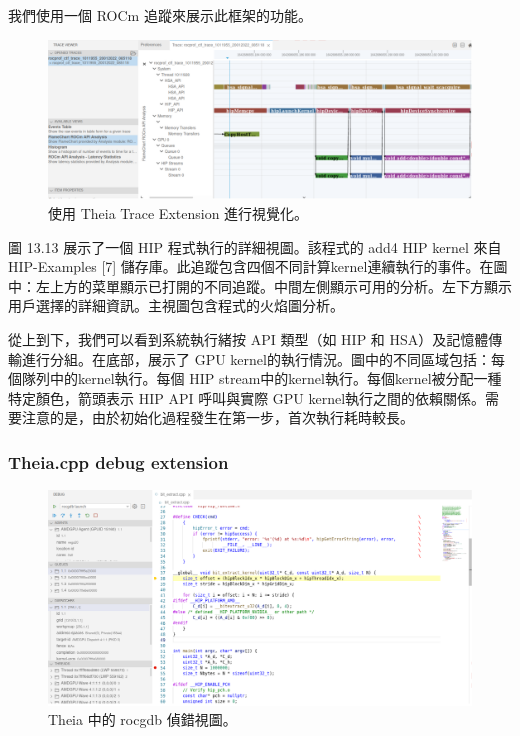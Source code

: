 我們使用一個 ROCm 追蹤來展示此框架的功能。

\begin{figure}
    \centering
    \includegraphics[width=0.9\linewidth]{FileAusiliari/Screenshots/Figure13-13.png}
    \caption{使用 Theia Trace Extension 進行視覺化。}
    \label{fig:PAPI13}
\end{figure}

圖 13.13 展示了一個 HIP 程式執行的詳細視圖。該程式的 add4 HIP kernel 來自 HIP-Examples [7] 儲存庫。此追蹤包含四個不同計算kernel連續執行的事件。在圖中：左上方的菜單顯示已打開的不同追蹤。中間左側顯示可用的分析。左下方顯示用戶選擇的詳細資訊。主視圖包含程式的火焰圖分析。

從上到下，我們可以看到系統執行緒按 API 類型（如 HIP 和 HSA）及記憶體傳輸進行分組。在底部，展示了 GPU kernel的執行情況。圖中的不同區域包括：每個隊列中的kernel執行。每個 HIP stream中的kernel執行。每個kernel被分配一種特定顏色，箭頭表示 HIP API 呼叫與實際 GPU kernel執行之間的依賴關係。需要注意的是，由於初始化過程發生在第一步，首次執行耗時較長。


\subsubsection{Theia.cpp debug extension}

\begin{figure}
    \centering
    \includegraphics[width=0.9\linewidth]{FileAusiliari/Screenshots/Figure13-14.png}
    \caption{Theia 中的 rocgdb 偵錯視圖。}
    \label{fig:PAPI14}
\end{figure}

